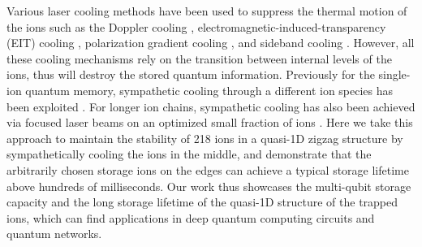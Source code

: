 \documentclass[aps,prl,reprint,superscriptaddress,twocolumn,longbibliography]{revtex4-1}
\begin{document}
Various laser cooling methods have been used to suppress the thermal motion of the ions such as the Doppler cooling \cite{RevModPhys.75.281}, electromagnetic-induced-transparency (EIT) cooling \cite{RevModPhys.75.281,PhysRevLett.126.023604,PhysRevLett.125.053001}, polarization gradient cooling \cite{Joshi_2020}, and sideband cooling \cite{RevModPhys.75.281}. However, all these cooling mechanisms rely on the transition between internal levels of the ions, thus will destroy the stored quantum information. Previously for the single-ion quantum memory, sympathetic cooling through a different ion species has been exploited \cite{wang2021single,PhysRevLett.118.053002,PhysRevA.65.040304,PhysRevA.68.042302,PhysRevA.79.050305}. For longer ion chains, sympathetic cooling has also been achieved via focused laser beams on an optimized small fraction of ions \cite{PhysRevLett.127.143201}. Here we take this approach to maintain the stability of 218 ions in a quasi-1D zigzag structure by sympathetically cooling the ions in the middle, and demonstrate that the arbitrarily chosen storage ions on the edges can achieve a typical storage lifetime above hundreds of milliseconds. Our work thus showcases the multi-qubit storage capacity and the long storage lifetime of the quasi-1D structure of the trapped ions, which can find applications in deep quantum computing circuits and quantum networks.
\end{document}
